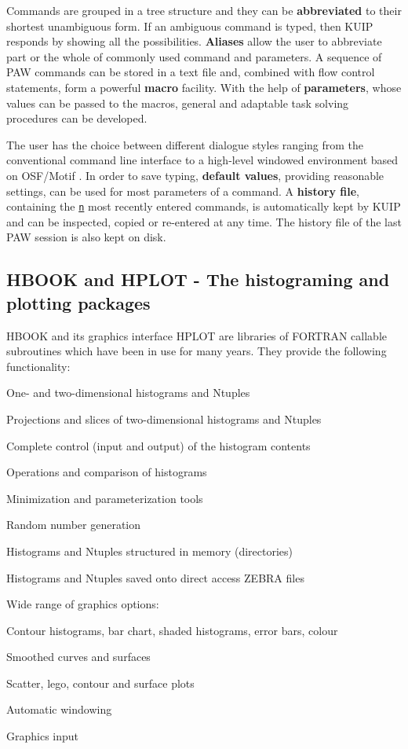 Commands are grouped in a tree structure and they can be
{\bf abbreviated} to their shortest unambiguous
form. If an ambiguous command is typed, then KUIP responds by showing
all the possibilities.
{\bf Aliases} allow the user to abbreviate part or the whole
of commonly used command and parameters.
A sequence of PAW commands can be stored in a text file and, combined
with flow control statements, form a powerful {\bf macro} facility.
With the help of {\bf parameters},
whose values can be passed to the macros, general and adaptable
task solving procedures can be developed.
 
 The user has the choice between different dialogue styles ranging from
the conventional command line interface to a high-level windowed environment
based on OSF/Motif .
In order to save typing, {\bf default values},
providing reasonable settings, can be used for most
parameters of a command. A {\bf history file},
containing the {\tt\underline{n}} most recently entered
commands, is automatically kept by KUIP
and can be inspected, copied or re-entered at any time.
The history file of the last PAW session is also kept on disk.

\subsection{HBOOK and HPLOT - The histograming and plotting packages}

HBOOK and its graphics interface
HPLOT are libraries of FORTRAN callable
subroutines which have been
in use for many years.
They provide the following functionality:

\begin{UL}
\item One- and two-dimensional histograms and Ntuples
\item Projections and slices of two-dimensional histograms and Ntuples
\item Complete control (input and output) of the histogram contents
\item Operations and comparison of histograms
\item Minimization and parameterization tools
\item Random number generation
\item Histograms and Ntuples structured in memory (directories)
\item Histograms and Ntuples saved onto direct access ZEBRA files
\item Wide range of graphics options:
\begin{UL}
\item Contour histograms, bar chart, shaded histograms, error bars, colour
\item Smoothed curves and surfaces
\item Scatter, lego, contour and surface plots
\item Automatic windowing
\item Graphics input
\end{UL}
\end{UL}

